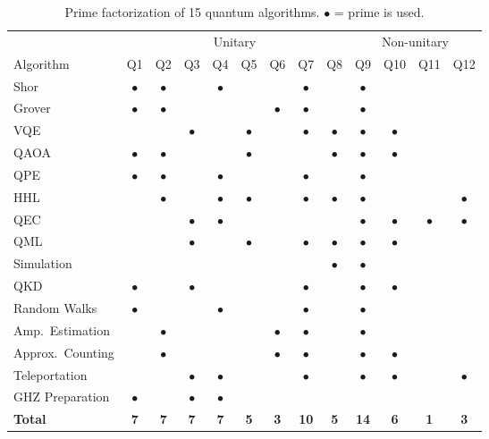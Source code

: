 \documentclass[11pt]{article}
\begin{document}
\begin{table}[h]
\centering
\caption{Prime factorization of 15 quantum algorithms. $\bullet$ = prime is used.}
\label{tab:factorization}
\footnotesize
\begin{tabular}{l cccccccc cccc}
\toprule
& \multicolumn{8}{c}{Unitary} & \multicolumn{4}{c}{Non-unitary} \\
\cmidrule(lr){2-9} \cmidrule(lr){10-13}
Algorithm & Q1 & Q2 & Q3 & Q4 & Q5 & Q6 & Q7 & Q8 & Q9 & Q10 & Q11 & Q12 \\
\midrule
Shor & $\bullet$ & $\bullet$ & & $\bullet$ & & & $\bullet$ & & $\bullet$ & & & \\
Grover & $\bullet$ & $\bullet$ & & & & $\bullet$ & $\bullet$ & & $\bullet$ & & & \\
VQE & & & $\bullet$ & & $\bullet$ & & $\bullet$ & $\bullet$ & $\bullet$ & $\bullet$ & & \\
QAOA & $\bullet$ & $\bullet$ & & & $\bullet$ & & & $\bullet$ & $\bullet$ & $\bullet$ & & \\
QPE & $\bullet$ & $\bullet$ & & $\bullet$ & & & $\bullet$ & & $\bullet$ & & & \\
HHL & & $\bullet$ & & $\bullet$ & $\bullet$ & & $\bullet$ & $\bullet$ & $\bullet$ & & & $\bullet$ \\
QEC & & & $\bullet$ & $\bullet$ & & & & & $\bullet$ & $\bullet$ & $\bullet$ & $\bullet$ \\
QML & & & $\bullet$ & & $\bullet$ & & $\bullet$ & $\bullet$ & $\bullet$ & $\bullet$ & & \\
Simulation & & & & & & & & $\bullet$ & $\bullet$ & & & \\
QKD & $\bullet$ & & $\bullet$ & & & & $\bullet$ & & $\bullet$ & $\bullet$ & & \\
Random Walks & $\bullet$ & & & $\bullet$ & & & $\bullet$ & & $\bullet$ & & & \\
Amp.\ Estimation & & $\bullet$ & & & & $\bullet$ & $\bullet$ & & $\bullet$ & & & \\
Approx.\ Counting & & $\bullet$ & & & & $\bullet$ & $\bullet$ & & $\bullet$ & $\bullet$ & & \\
Teleportation & & & $\bullet$ & $\bullet$ & & & $\bullet$ & & $\bullet$ & $\bullet$ & & $\bullet$ \\
GHZ Preparation & $\bullet$ & & $\bullet$ & $\bullet$ & & & & & & & & \\
\midrule
\textbf{Total} & \textbf{7} & \textbf{7} & \textbf{7} & \textbf{7} & \textbf{5} & \textbf{3} & \textbf{10} & \textbf{5} & \textbf{14} & \textbf{6} & \textbf{1} & \textbf{3} \\
\bottomrule
\end{tabular}
\end{table}
\end{document}

